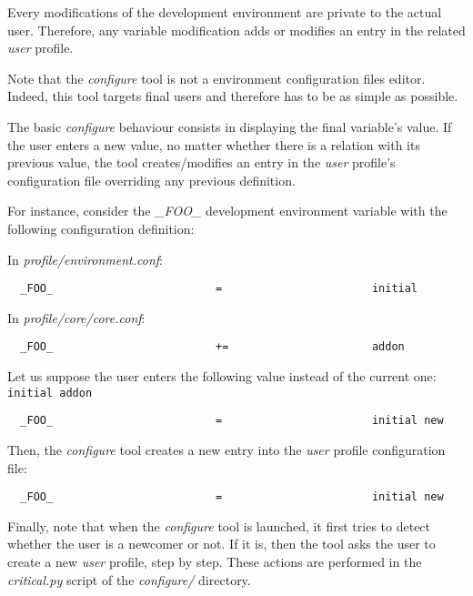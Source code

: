 Every modifications of the development environment are private to the actual
user. Therefore, any variable modification adds or modifies an entry in the
related \textit{user} profile.

Note that the \textit{configure} tool is not a environment configuration
files editor. Indeed, this tool targets final users and therefore has to
be as simple as possible.

The basic \textit{configure} behaviour consists in displaying the final
variable's value. If the user enters a new value, no matter whether there is
a relation with its previous value, the tool creates/modifies an entry in the
\textit{user} profile's configuration file overriding any previous definition.

For instance, consider the \textit{\_FOO\_} development environment variable
with the following configuration definition:

In \textit{profile/environment.conf}:

\begin{verbatim}
  _FOO_                         =                       initial
\end{verbatim}

In \textit{profile/core/core.conf}:

\begin{verbatim}
  _FOO_                         +=                      addon
\end{verbatim}

Let us suppose the user enters the following value instead of the current
one: \verb|initial addon|

\begin{verbatim}
  _FOO_                         =                       initial new
\end{verbatim}

Then, the \textit{configure} tool creates a new entry into the \textit{user}
profile configuration file:

\begin{verbatim}
  _FOO_                         =                       initial new
\end{verbatim}

Finally, note that when the \textit{configure} tool is launched, it first
tries to detect whether the user is a newcomer or not. If it is, then the
tool asks the user to create a new \textit{user} profile, step by step. These
actions are performed in the \textit{critical.py} script of the
\textit{configure/} directory.

